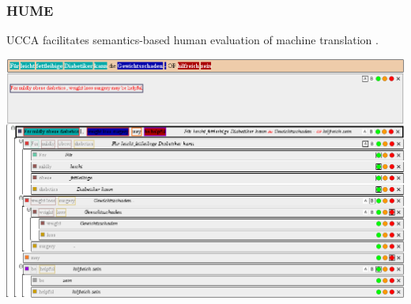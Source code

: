 \documentclass[t]{beamer}
\begin{document}
\begin{frame}
\frametitle{HUME}
UCCA facilitates semantics-based human evaluation of machine translation \cite{birch2016hume}.
\vfill
\begin{adjustbox}{center}
  \includegraphics[width=\pagewidth,height=\textheight,keepaspectratio]{hume.png}
\end{adjustbox}
\end{frame}
\end{document}
